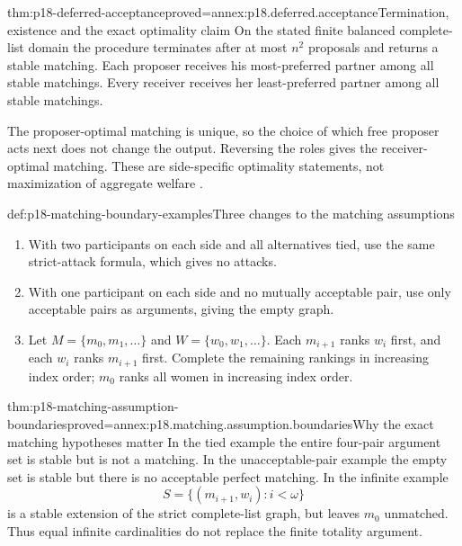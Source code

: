 \begin{hbtheorem}{thm:p18-deferred-acceptance}{proved=annex:p18.deferred.acceptance}{Termination, existence and the exact optimality claim}
On the stated finite balanced complete-list
domain the procedure terminates after
at most \(n^2\) proposals and returns
a stable matching. Each proposer receives
his most-preferred partner among all
stable matchings. Every receiver receives
her least-preferred partner among all
stable matchings.

The proposer-optimal matching is unique,
so the choice of which free proposer
acts next does not change the output.
Reversing the roles gives the receiver-optimal
matching. These are side-specific
optimality statements, not maximization
of aggregate welfare
\cite[secs.~3 and 5]{GaleShapley1962}.
\end{hbtheorem}

\begin{hbdefinition}{def:p18-matching-boundary-examples}{Three changes to the matching assumptions}
\begin{enumerate}
\item With two participants on each side and all
      alternatives tied, use the same strict-attack
      formula, which gives no attacks.
\item With one participant on each side and no
      mutually acceptable pair, use only acceptable
      pairs as arguments, giving the empty graph.
\item Let \(M=\{m_0,m_1,\ldots\}\) and
      \(W=\{w_0,w_1,\ldots\}\). Each \(m_{i+1}\)
      ranks \(w_i\) first, and each \(w_i\)
      ranks \(m_{i+1}\) first. Complete the
      remaining rankings in increasing index
      order; \(m_0\) ranks all women in
      increasing index order.
\end{enumerate}
\end{hbdefinition}

\begin{hbtheorem}{thm:p18-matching-assumption-boundaries}{proved=annex:p18.matching.assumption.boundaries}{Why the exact matching hypotheses matter}
In the tied example the entire four-pair
argument set is stable but is not a
matching. In the unacceptable-pair
example the empty set is stable but
there is no acceptable perfect matching.
In the infinite example
\[
                         S=\{(m_{i+1},w_i):i<\omega\}
\]
is a stable extension of the strict
complete-list graph, but leaves \(m_0\)
unmatched. Thus equal infinite cardinalities
do not replace the finite totality
argument.
\end{hbtheorem}

